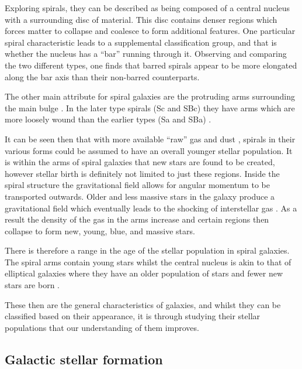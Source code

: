 \documentclass[12pt, twocolumn]{revtex4-1}    %
\begin{document}
Exploring spirals, they can be described as being composed of a central nucleus with a surrounding disc of material. This disc contains denser regions which forces matter to collapse and coalesce to form additional features. One particular spiral characteristic leads to a supplemental classification group, and that is whether the nucleus has a ``bar'' running through it. Observing and comparing the two different types, one finds that barred spirals appear to be more elongated along the bar axis than their non-barred counterparts. 

The other main attribute for spiral galaxies are the protruding arms surrounding the main bulge \citep{carroll_astro}. In the later type spirals (Sc and SBc) they have arms which are more loosely wound than the earlier types (Sa and SBa) \citep{moore_databook}.

It can be seen then that with more available ``raw'' gas and dust \citep{carroll_astro}, spirals in their various forms could be assumed to have an overall younger stellar population. It is within the arms of spiral galaxies that new stars are found to be created, however stellar birth is definitely not limited to just these regions. Inside the spiral structure the gravitational field allows for angular momentum to be transported outwards. Older and less massive stars in the galaxy produce a gravitational field which eventually leads to the shocking of interstellar gas \citep{binney_galaxies}. As a result the density of the gas in the arms increase and certain regions then collapse to form new, young, blue, and massive stars. 

There is therefore a range in the age of the stellar population in spiral galaxies. The spiral arms contain young stars whilst the central nucleus is akin to that of elliptical galaxies where they have an older population of stars and fewer new stars are born \citep{carroll_astro, binney_galaxies}.

These then are the general characteristics of galaxies, and whilst they can be classified based on their appearance, it is through studying their stellar populations that our understanding of them improves. 


\subsection{Galactic stellar formation}
\end{document}

